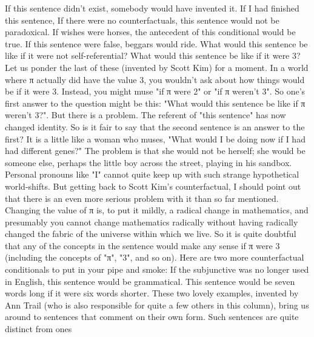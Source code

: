 If this sentence didn't exist, somebody would have invented it. If I had finished this sentence, 
If there were no counterfactuals, this sentence would not be paradoxical. 
If wishes were horses, the antecedent of this conditional would be true. 
If this sentence were false, beggars would ride. 
What would this sentence be like if it were not self-referential? 
What would this sentence be like if it were 3? 
Let us ponder the last of these (invented by Scott Kim) for a moment. In a world where π actually did have the value 3, you wouldn't ask about how things would be if it were 3. Instead, you might muse "if π were 2" or "if π weren't 3". So one's first answer to the question might be this: "What would this sentence be like if π weren't 3?". But there is a problem. The referent of "this sentence" has now changed identity. So is it fair to say that the second sentence is an answer to the first? It is a little like a woman who muses, "What would I be doing now if I had had different genes?" The problem is that she would not be herself; she would be someone else, perhaps the little boy across the street, playing in his sandbox. Personal pronouns like "I" cannot quite keep up with such strange hypothetical world-shifts. But getting back to Scott Kim's counterfactual, I should point out that there is an even more serious problem with it than so far mentioned. Changing the value of π is, to put it mildly, a radical change in mathematics, and presumably you cannot change mathematics radically without having radically changed the fabric of the universe within which we live. So it is quite doubtful that any of the concepts in the sentence would make any sense if π were 3 (including the concepts of "π", "3", and so on). 
Here are two more counterfactual conditionals to put in your pipe and smoke: 
If the subjunctive was no longer used in English, this sentence would be grammatical. 
This sentence would be seven words long if it were six words shorter. 
These two lovely examples, invented by Ann Trail (who is also responsible for quite a few others in this column), bring us around to sentences that comment on their own form. Such sentences are quite distinct from ones 



